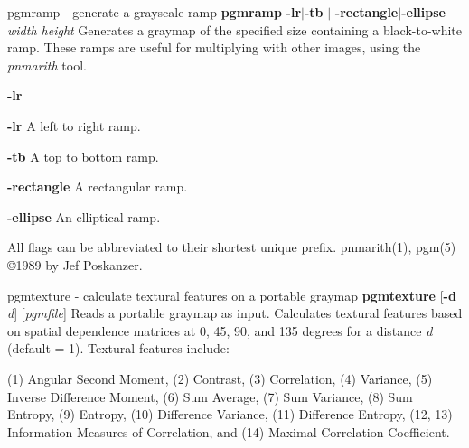 \newpage
%

pgmramp - generate a grayscale ramp
{\bf pgmramp}
{\bf -lr}{\rm $|$}{\bf -tb}
$|$
{\bf -rectangle}{\rm $|$}{\bf -ellipse}
{\it width height}
Generates a graymap of the specified size containing a black-to-white ramp.
These ramps are useful for multiplying with other images, using the
{\it pnmarith}
tool.
\begin{TPlist}{{\bf -lr}}
\item[{{\bf -lr}}]
A left to right ramp.
\item[{{\bf -tb}}]
A top to bottom ramp.
\item[{{\bf -rectangle}}]
A rectangular ramp.
\item[{{\bf -ellipse}}]
An elliptical ramp.
\end{TPlist}

\par
All flags can be abbreviated to their shortest unique prefix.
pnmarith(1), pgm(5)
\copyright 1989 by Jef Poskanzer.
%
 
%

\newpage
%

pgmtexture - calculate textural features on a portable graymap
{\bf pgmtexture}
{\rm [}{\bf -d}
{\it d}{\rm ]}
{\rm [}{\it pgmfile}{\rm ]}
Reads a portable graymap as input.  Calculates textural features
based on spatial dependence matrices at 0, 45, 90, and 135 degrees for
a distance 
{\it d}
(default = 1).
Textural features include:
\begin{IPlist}
\IPitem{{}}
(1) Angular Second Moment,
\nwl
(2) Contrast,
\nwl
(3) Correlation,
\nwl
(4) Variance,          
\nwl
(5) Inverse Difference Moment,
\nwl
(6) Sum Average,
\nwl
(7) Sum Variance,
\nwl
(8) Sum Entropy,
\nwl
(9) Entropy,
\nwl
(10) Difference Variance,
\nwl
(11) Difference Entropy,
\nwl
(12, 13) Information Measures of Correlation, and
\nwl
(14) Maximal Correlation Coefficient.
\end{IPlist}

